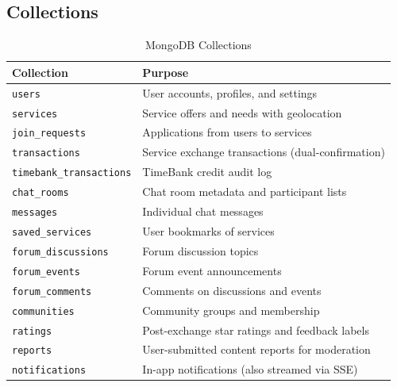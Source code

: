 \documentclass[10pt,a4paper]{report}
\begin{document}
\subsection{Collections}

\begin{table}[h]
    \centering
    \begin{tabularx}{\textwidth}{|l|X|}
        \hline
        \textbf{Collection}              & \textbf{Purpose}                                                    \\
        \hline
        \texttt{users}                   & User accounts, profiles, and settings                               \\
        \hline
        \texttt{services}                & Service offers and needs with geolocation                           \\
        \hline
        \texttt{join\_requests}          & Applications from users to services                                 \\
        \hline
        \texttt{transactions}            & Service exchange transactions (dual-confirmation)                   \\
        \hline
        \texttt{timebank\_transactions}  & TimeBank credit audit log                                           \\
        \hline
        \texttt{chat\_rooms}             & Chat room metadata and participant lists                            \\
        \hline
        \texttt{messages}                & Individual chat messages                                            \\
        \hline
        \texttt{saved\_services}         & User bookmarks of services                                          \\
        \hline
        \texttt{forum\_discussions}      & Forum discussion topics                                             \\
        \hline
        \texttt{forum\_events}           & Forum event announcements                                           \\
        \hline
        \texttt{forum\_comments}         & Comments on discussions and events                                  \\
        \hline
        \texttt{communities}             & Community groups and membership                                     \\
        \hline
        \texttt{ratings}                 & Post-exchange star ratings and feedback labels                      \\
        \hline
        \texttt{reports}                 & User-submitted content reports for moderation                       \\
        \hline
        \texttt{notifications}           & In-app notifications (also streamed via SSE)                        \\
        \hline
    \end{tabularx}
    \caption{MongoDB Collections}
\end{table}
\end{document}
